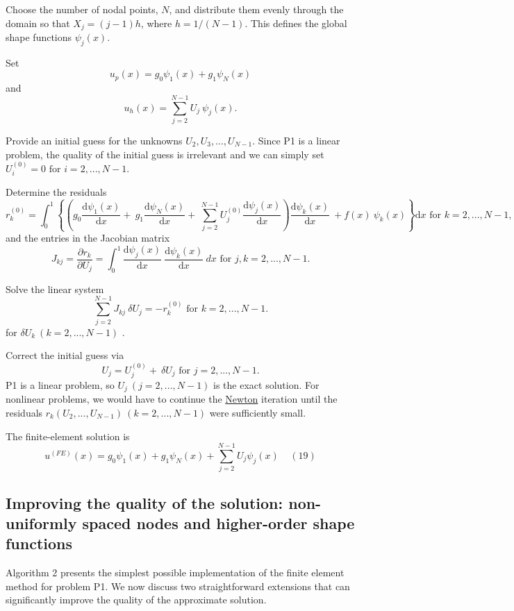 \begin{DoxyItemize}
\item Choose the number of nodal points, $ N $, and distribute them evenly through the domain so that $ X_j=(j-1)h$, where $h=1/(N-1)$. This defines the global shape functions $ \psi_j(x)$.
\item Set \[ u_p(x) = g_0 \psi_1(x) + g_1 \psi_N(x) \] and \[ u_h(x) = \sum_{j=2}^{N-1} U_{j}\ \psi_j(x). \]
\item Provide an initial guess for the unknowns $ U_2,U_3,...,U_{N-1}$. Since P1 is a linear problem, the quality of the initial guess is irrelevant and we can simply set $ U_i^{(0)}=0 \mbox{\ \ \ for $i=2,...,N-1$}. $
\item Determine the residuals \[ r_k^{(0)} = \int_0^1 \left\{ \left( g_0 \frac{\mbox{d} \psi_1(x)}{\mbox{d} x} + \ g_1 \frac{\mbox{d} \psi_N(x)}{\mbox{d} x} + \ \sum_{j=2}^{N-1} U_{j}^{(0)}\frac{\mbox{d} \psi_j(x)}{\mbox{d} x} \right) \frac{\mbox{d} \psi_k(x)}{\mbox{d} x}\ + f(x) \ \psi_k(x) \right\} \mbox{d}x \mbox{\ \ \ \ \ \ for $k=2,...,N-1,$} \] and the entries in the Jacobian matrix \[ J_{kj} = \frac{\partial r_k}{\partial U_j} = \int_0^1 \frac{\mbox{d} \psi_j(x)}{\mbox{d} x} \ \frac{\mbox{d} \psi_k(x)}{\mbox{d} x} \ dx \mbox{\ \ \ for $j,k=2,...,N-1.$} \]
\item Solve the linear system \[ \sum_{j=2}^{N-1} J_{kj} \ \delta U_j = - r_k^{(0)} \mbox{\ \ \ for $k=2,...,N-1.$} \] for $ \delta U_k \ (k=2,...,N-1) $ .
\item Correct the initial guess via \[ U_j = U_j^{(0)} + \ \delta U_j \mbox{\ \ \ for $j=2,...,N-1.$} \] P1 is a linear problem, so $ U_j \ (j=2,...,N-1) $ is the exact solution. For nonlinear problems, we would have to continue the \hyperlink{index_Newton}{Newton} iteration until the residuals $ r_k(U_2,...,U_{N-1}) \ (k=2,...,N-1) $ were sufficiently small.
\item The finite-\/element solution is \[ u^{(FE)}(x) = g_0 \psi_1(x)+ g_1 \psi_N(x) + \sum_{j=2}^{N-1} U_j \psi_j(x) \ \ \ \ \ (19) \]
\end{DoxyItemize}

\hypertarget{index_non_uniform}{}\subsection{Improving the quality of the solution\-: non-\/uniformly spaced nodes and higher-\/order shape functions}\label{index_non_uniform}
Algorithm 2 presents the simplest possible implementation of the finite element method for problem P1. We now discuss two straightforward extensions that can significantly improve the quality of the approximate solution.


